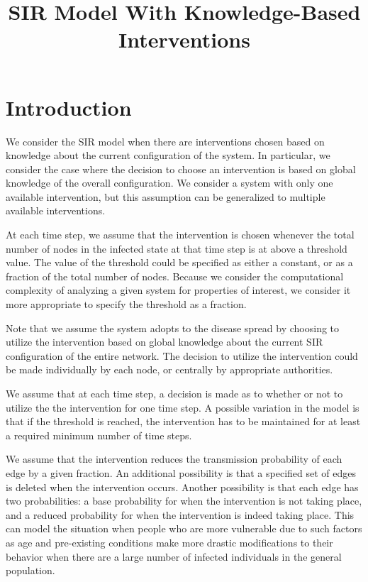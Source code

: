 \documentclass[11pt]{article}
\title{\textbf{SIR Model With Knowledge-Based Interventions}}
\author{  
\vspace*{1ex}  
}
\begin{document}
 
 
\maketitle  
 
\normalbaselineskip

\section{Introduction}
\label{sec:introduction}
  
  We consider the SIR model when there are interventions chosen based on 
  knowledge about the current configuration of the system.
  In particular, we consider the case where the decision to choose an intervention is based on 
  global knowledge of the overall configuration.
  We consider a system with only one available intervention, 
  but this assumption can be generalized to multiple available interventions.
  
  At each time step, we assume that the intervention is chosen whenever the total number of nodes 
  in the infected state at that time step is at above a threshold value.
  The value of the threshold could be specified as either a constant,
  or as a fraction of the total number of nodes.
  Because we consider the computational complexity of analyzing a given system for properties of interest,
  we consider it more appropriate to specify the threshold as a fraction.
  
  Note that we assume the system adopts to the disease spread by choosing to utilize the intervention based on 
  global knowledge about the current SIR configuration of the entire network.
  The decision to utilize the intervention could be made individually by each node,
  or centrally by appropriate authorities.
  
  We assume that at each time step, 
  a decision is made as to whether or not to utilize the the intervention for one time step.
  A possible variation in the model is that if the threshold is reached, the intervention has to be maintained for 
  at least a required minimum number of time steps.
  
  We assume that the intervention reduces the transmission probability of each edge by a given fraction.
  An additional possibility is that a specified set of edges is deleted when the intervention occurs.
  Another possibility is that each edge has two probabilities:
  a base probability for when the intervention is not taking place,
  and a reduced probability for when the intervention is indeed taking place.
  This can model the situation when people who are more vulnerable 
  due to such factors as age and pre-existing conditions
  make more drastic modifications to their behavior when 
  there are a large number of infected individuals in the general population.
  
\end{document}
